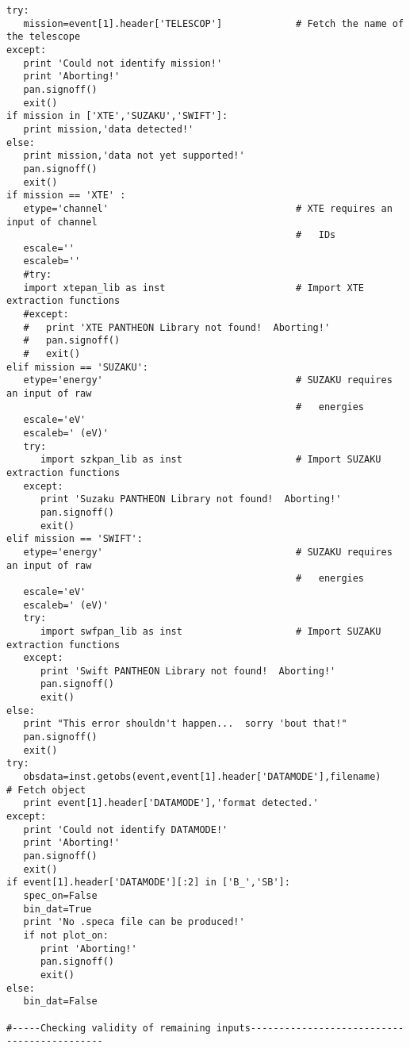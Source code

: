 \begin{verbatim}
try:
   mission=event[1].header['TELESCOP']             # Fetch the name of the telescope
except:
   print 'Could not identify mission!'
   print 'Aborting!'
   pan.signoff()
   exit()
if mission in ['XTE','SUZAKU','SWIFT']:
   print mission,'data detected!'
else:
   print mission,'data not yet supported!'
   pan.signoff()
   exit()
if mission == 'XTE' :
   etype='channel'                                 # XTE requires an input of channel
                                                   #   IDs
   escale=''
   escaleb=''
   #try:
   import xtepan_lib as inst                       # Import XTE extraction functions
   #except:
   #   print 'XTE PANTHEON Library not found!  Aborting!'
   #   pan.signoff()
   #   exit()
elif mission == 'SUZAKU':
   etype='energy'                                  # SUZAKU requires an input of raw
                                                   #   energies
   escale='eV'
   escaleb=' (eV)'
   try:
      import szkpan_lib as inst                    # Import SUZAKU extraction functions
   except:
      print 'Suzaku PANTHEON Library not found!  Aborting!'
      pan.signoff()
      exit()
elif mission == 'SWIFT':
   etype='energy'                                  # SUZAKU requires an input of raw
                                                   #   energies
   escale='eV'
   escaleb=' (eV)'
   try:
      import swfpan_lib as inst                    # Import SUZAKU extraction functions
   except:
      print 'Swift PANTHEON Library not found!  Aborting!'
      pan.signoff()
      exit()
else:
   print "This error shouldn't happen...  sorry 'bout that!"
   pan.signoff()
   exit()
try:
   obsdata=inst.getobs(event,event[1].header['DATAMODE'],filename)       # Fetch object
   print event[1].header['DATAMODE'],'format detected.'
except:
   print 'Could not identify DATAMODE!'
   print 'Aborting!'
   pan.signoff()
   exit()
if event[1].header['DATAMODE'][:2] in ['B_','SB']:
   spec_on=False
   bin_dat=True
   print 'No .speca file can be produced!'
   if not plot_on:
      print 'Aborting!'
      pan.signoff()
      exit()
else:
   bin_dat=False

#-----Checking validity of remaining inputs--------------------------------------------


\end{verbatim}
